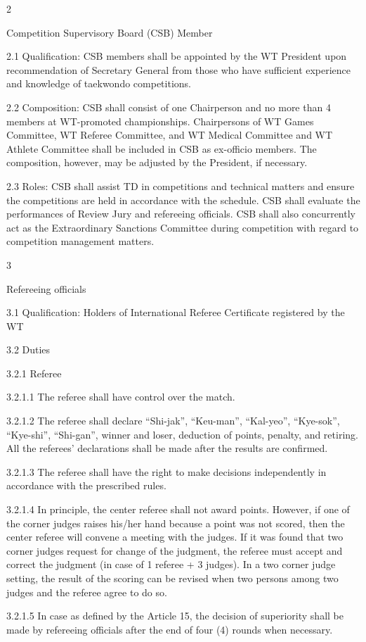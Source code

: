 \documentclass[
]{report}
\begin{document}
2

Competition Supervisory Board (CSB) Member

2.1 Qualification: CSB members shall be appointed by the WT President
upon recommendation of Secretary General from those who have sufficient
experience and knowledge of taekwondo competitions.

2.2 Composition: CSB shall consist of one Chairperson and no more than 4
members at WT-promoted championships. Chairpersons of WT Games
Committee, WT Referee Committee, and WT Medical Committee and WT Athlete
Committee shall be included in CSB as ex-officio members. The
composition, however, may be adjusted by the President, if necessary.

2.3 Roles: CSB shall assist TD in competitions and technical matters and
ensure the competitions are held in accordance with the schedule. CSB
shall evaluate the performances of Review Jury and refereeing officials.
CSB shall also concurrently act as the Extraordinary Sanctions Committee
during competition with regard to competition management matters.

3

Refereeing officials

3.1 Qualification: Holders of International Referee Certificate
registered by the WT

3.2 Duties

3.2.1 Referee

3.2.1.1 The referee shall have control over the match.

3.2.1.2 The referee shall declare ``Shi-jak'', ``Keu-man'', ``Kal-yeo'',
``Kye-sok'', ``Kye-shi'', ``Shi-gan'', winner and loser, deduction of
points, penalty, and retiring. All the referees' declarations shall be
made after the results are confirmed.

3.2.1.3 The referee shall have the right to make decisions independently
in accordance with the prescribed rules.

3.2.1.4 In principle, the center referee shall not award points.
However, if one of the corner judges raises his/her hand because a point
was not scored, then the center referee will convene a meeting with the
judges. If it was found that two corner judges request for change of the
judgment, the referee must accept and correct the judgment (in case of 1
referee + 3 judges). In a two corner judge setting, the result of the
scoring can be revised when two persons among two judges and the referee
agree to do so.

3.2.1.5 In case as defined by the Article 15, the decision of
superiority shall be made by refereeing officials after the end of four
(4) rounds when necessary.
\end{document}
